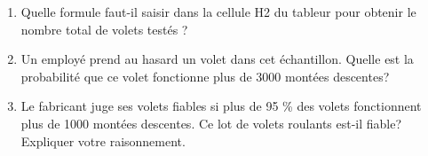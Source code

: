 \begin{enumerate}
\item  Quelle formule faut-il saisir dans la cellule H2 du tableur pour obtenir le nombre total de volets testés ? 

\item  Un employé prend au hasard un volet dans cet échantillon. Quelle est la probabilité que ce volet fonctionne plus de 3000 montées descentes? 

\item  Le fabricant juge ses volets fiables si plus de 95 \% des volets fonctionnent plus de 1000 montées descentes. Ce lot de volets roulants est-il fiable? Expliquer votre raisonnement. 
\end{enumerate}

\bigskip

